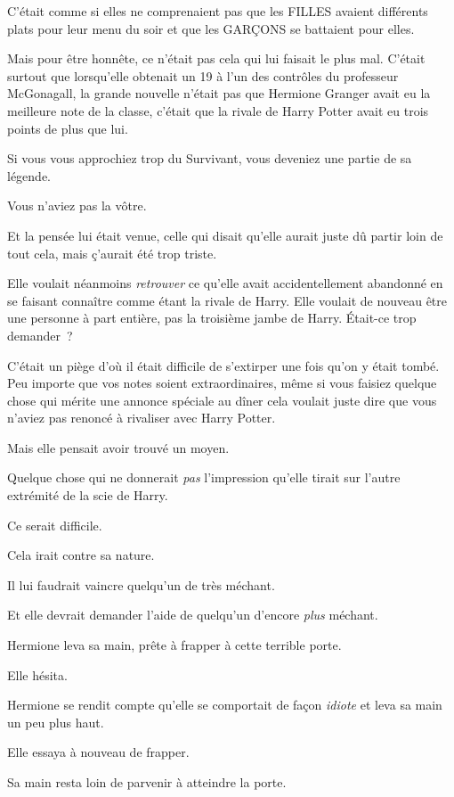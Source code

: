 C'était comme si elles ne comprenaient pas que les FILLES avaient différents plats pour leur menu du soir et que les GARÇONS se battaient pour elles.

Mais pour être honnête, ce n'était pas cela qui lui faisait le plus mal. C'était surtout que lorsqu'elle obtenait un 19 à l'un des contrôles du professeur McGonagall, la grande nouvelle n'était pas que Hermione Granger avait eu la meilleure note de la classe, c'était que la rivale de Harry Potter avait eu trois points de plus que lui.

Si vous vous approchiez trop du Survivant, vous deveniez une partie de sa légende.

Vous n'aviez pas la vôtre.

Et la pensée lui était venue, celle qui disait qu'elle aurait juste dû partir loin de tout cela, mais ç'aurait été trop triste.

Elle voulait néanmoins \emph{retrouver} ce qu'elle avait accidentellement abandonné en se faisant connaître comme étant la rivale de Harry. Elle voulait de nouveau être une personne à part entière, pas la troisième jambe de Harry. Était-ce trop demander~?

C'était un piège d'où il était difficile de s'extirper une fois qu'on y était tombé. Peu importe que vos notes soient extraordinaires, même si vous faisiez quelque chose qui mérite une annonce spéciale au dîner cela voulait juste dire que vous n'aviez pas renoncé à rivaliser avec Harry Potter.

Mais elle pensait avoir trouvé un moyen.

Quelque chose qui ne donnerait \emph{pas} l'impression qu'elle tirait sur l'autre extrémité de la scie de Harry.

Ce serait difficile.

Cela irait contre sa nature.

Il lui faudrait vaincre quelqu'un de très méchant.

Et elle devrait demander l'aide de quelqu'un d'encore \emph{plus} méchant.

Hermione leva sa main, prête à frapper à cette terrible porte.

Elle hésita.

Hermione se rendit compte qu'elle se comportait de façon \emph{idiote} et leva sa main un peu plus haut.

Elle essaya à nouveau de frapper.

Sa main resta loin de parvenir à atteindre la porte.

